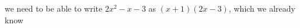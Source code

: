       
      \label{m39247*id149590}we need to be able to write \begin{math}2{x}^{2}-x-3\end{math} as \begin{math}\left(x+1\right)\left(2x-3\right)\end{math}, which we already know
%             
